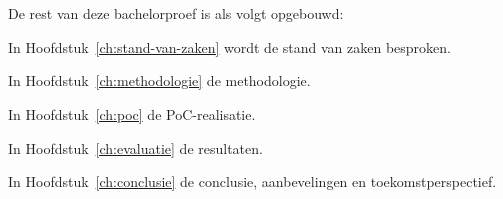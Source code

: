 \section{}
\label{sec:opzet-bachelorproef}

De rest van deze bachelorproef is als volgt opgebouwd:

In Hoofdstuk~\ref{ch:stand-van-zaken} wordt de stand van zaken besproken.

In Hoofdstuk~\ref{ch:methodologie} de methodologie.

In Hoofdstuk~\ref{ch:poc} de PoC-realisatie.

In Hoofdstuk~\ref{ch:evaluatie} de resultaten.

In Hoofdstuk~\ref{ch:conclusie} de conclusie, aanbevelingen en toekomstperspectief.